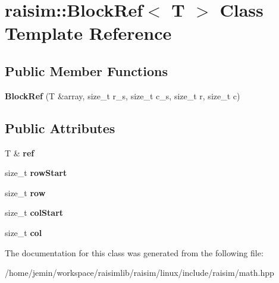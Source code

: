 \hypertarget{classraisim_1_1BlockRef}{}\section{raisim\+:\+:Block\+Ref$<$ T $>$ Class Template Reference}
\label{classraisim_1_1BlockRef}
\subsection*{Public Member Functions}
\begin{DoxyCompactItemize}
\item 
\mbox{\label{classraisim_1_1BlockRef_a3d33edea2a4cda43c5490a8147b26fda}} 
{\bfseries Block\+Ref} (T \&array, size\+\_\+t r\+\_\+s, size\+\_\+t c\+\_\+s, size\+\_\+t r, size\+\_\+t c)
\end{DoxyCompactItemize}
\subsection*{Public Attributes}
\begin{DoxyCompactItemize}
\item 
\mbox{\label{classraisim_1_1BlockRef_a2f1b763ea6565e1a87c9ba1e6b95d2f1}} 
T \& {\bfseries ref}
\item 
\mbox{\label{classraisim_1_1BlockRef_a7181fc006970c03d6157ab0d253994a7}} 
size\+\_\+t {\bfseries row\+Start}
\item 
\mbox{\label{classraisim_1_1BlockRef_a9be186339ebdf034c0be3c03389139b8}} 
size\+\_\+t {\bfseries row}
\item 
\mbox{\label{classraisim_1_1BlockRef_a8b7b4ae6883f965ace3ce0e714d52aeb}} 
size\+\_\+t {\bfseries col\+Start}
\item 
\mbox{\label{classraisim_1_1BlockRef_a02375545690f996e025ea6952ca089c7}} 
size\+\_\+t {\bfseries col}
\end{DoxyCompactItemize}


The documentation for this class was generated from the following file\+:\begin{DoxyCompactItemize}
\item 
/home/jemin/workspace/raisimlib/raisim/linux/include/raisim/math.\+hpp\end{DoxyCompactItemize}
